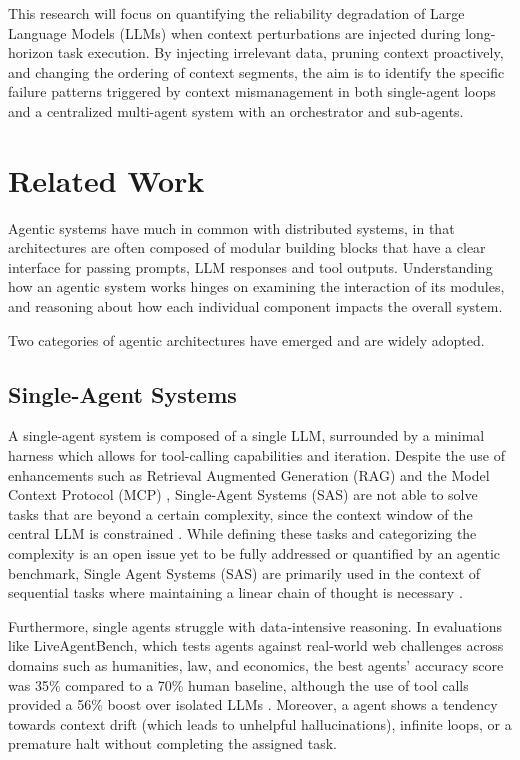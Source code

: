 \documentclass[conference]{IEEEtran}
\begin{document}
This research will focus on quantifying the reliability degradation of Large Language Models (LLMs)
when context perturbations are injected during long-horizon task execution.
By injecting irrelevant data, pruning context proactively, and changing the ordering of context
segments, the aim is to identify the specific failure patterns triggered by context mismanagement
in both single-agent loops and a centralized multi-agent system with an orchestrator and sub-agents.

\section{Related Work}
Agentic systems have much in common with distributed systems, in that architectures are often composed 
of modular building blocks that have a clear interface for passing prompts, LLM responses and tool outputs. 
Understanding how an agentic system works hinges on examining the interaction of its modules,
and reasoning about how each individual component impacts the overall system.

Two categories of agentic architectures have emerged and are widely adopted.

\subsection{Single-Agent Systems}
A single-agent system is composed of a single LLM, surrounded by a minimal harness which allows for
tool-calling capabilities and iteration.
Despite the use of enhancements such as Retrieval Augmented Generation (RAG)
and the Model Context Protocol (MCP) \cite{ehtesham_survey_2025}, Single-Agent Systems (SAS) are not able
to solve tasks that are beyond a certain complexity,
since the context window of the central LLM is constrained \cite{gao_single-agent_2025, patel_dynamic_2026}.
While defining these tasks and categorizing the complexity is an open issue yet
to be fully addressed or quantified by an agentic benchmark, Single Agent Systems (SAS) 
are primarily used in the context of sequential tasks where maintaining a linear chain of thought 
is necessary \cite{kim_towards_2026}.

Furthermore, single agents struggle with data-intensive reasoning. 
In evaluations like LiveAgentBench, which tests agents against real-world web challenges across domains such 
as humanities, law, and economics, the best agents' accuracy score was 35\% compared to a 70\% human baseline, 
although the use of tool calls provided a 56\% boost over isolated LLMs \cite{li_liveagentbench_2026}. 
Moreover, a agent shows a tendency towards context drift (which leads to unhelpful hallucinations),
infinite loops, or a premature halt without completing the assigned task.
\end{document}
